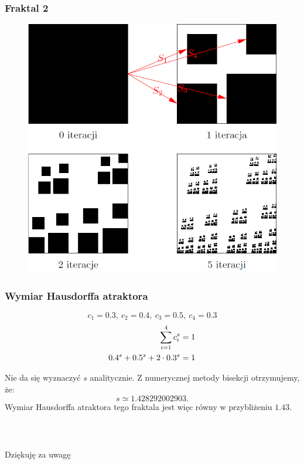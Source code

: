 \documentclass[11pt,usenames,dvipsnames,svgnames,x11names]{beamer}
\theoremstyle{plain}
\theoremstyle{definition}
\theoremstyle{remark}
\begin{document}
\begin{frame}
\frametitle{Fraktal 2}
	\begin{center}
		\begin{figure}[htbp]
			\includegraphics[scale=0.3]{kwadrat.jpg}
		\end{figure}
	\end{center}
\end{frame}

\begin{frame}
\frametitle{Wymiar Hausdorffa atraktora}
$$c_1=0.3,~c_2=0.4,~c_3=0.5,~c_4=0.3$$
$$
\aligned
\sum_{i=1}^4 c_i^s&=1\\
0.4^s+0.5^s+2\cdot0.3^s&=1\\
\endaligned
$$

Nie da się wyznaczyć $s$ analitycznie. Z numerycznej metody bisekcji otrzymujemy, że:
$$
s\simeq 1.428292002903.
$$
Wymiar Hausdorffa atraktora tego fraktala jest więc równy w przybliżeniu $1.43$.

\end{frame}

\begin{frame}   %
\frametitle{~}
\begin{center}
\Large{Dziękuję za uwagę}
\end{center}

\end{frame}
\end{document}
